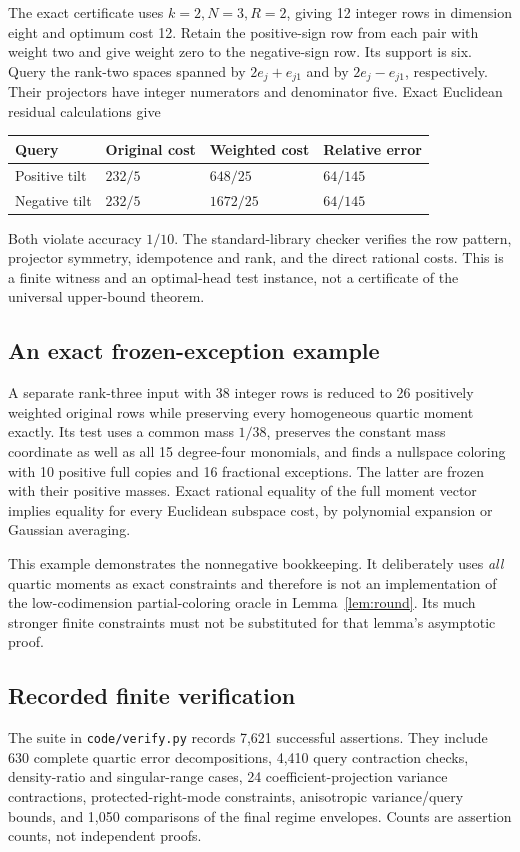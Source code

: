 \documentclass[11pt]{article}
\theoremstyle{remark}\newtheorem{remark}[theorem]{Remark}
\numberwithin{equation}{section}
\begin{document}
The exact certificate uses $k=2,N=3,R=2$, giving 12 integer rows in dimension eight and optimum cost 12. Retain the positive-sign row from each pair with weight two and give weight zero to the negative-sign row. Its support is six. Query the rank-two spaces spanned by $2e_j+e_{j1}$ and by $2e_j-e_{j1}$, respectively. Their projectors have integer numerators and denominator five. Exact Euclidean residual calculations give
\begin{center}
\begin{tabular}{@{}llll@{}}\toprule
Query & Original cost & Weighted cost & Relative error\\\midrule
Positive tilt & $232/5$ & $648/25$ & $64/145$\\
Negative tilt & $232/5$ & $1672/25$ & $64/145$\\\bottomrule
\end{tabular}
\end{center}
Both violate accuracy $1/10$. The standard-library checker verifies the row pattern, projector symmetry, idempotence and rank, and the direct rational costs. This is a finite witness and an optimal-head test instance, not a certificate of the universal upper-bound theorem.

\subsection{An exact frozen-exception example}
A separate rank-three input with 38 integer rows is reduced to 26 positively weighted original rows while preserving every homogeneous quartic moment exactly. Its test uses a common mass $1/38$, preserves the constant mass coordinate as well as all 15 degree-four monomials, and finds a nullspace coloring with 10 positive full copies and 16 fractional exceptions. The latter are frozen with their positive masses. Exact rational equality of the full moment vector implies equality for every Euclidean subspace cost, by polynomial expansion or Gaussian averaging.

This example demonstrates the nonnegative bookkeeping. It deliberately uses \emph{all} quartic moments as exact constraints and therefore is not an implementation of the low-codimension partial-coloring oracle in Lemma~\ref{lem:round}. Its much stronger finite constraints must not be substituted for that lemma's asymptotic proof.

\subsection{Recorded finite verification}
The suite in \texttt{code/verify.py} records 7,621 successful assertions. They include 630 complete quartic error decompositions, 4,410 query contraction checks, density-ratio and singular-range cases, 24 coefficient-projection variance contractions, protected-right-mode constraints, anisotropic variance/query bounds, and 1,050 comparisons of the final regime envelopes. Counts are assertion counts, not independent proofs.
\end{document}
